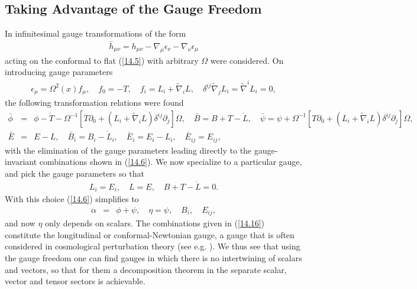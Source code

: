 \documentclass[aps,onecolumn,10pt]{revtex4}
\numberwithin{equation}{section}
\numberwithin{equation}{section}
\begin{document}
\subsection{Taking Advantage of the Gauge Freedom}
\label{14c}

In \cite{Amarasinghe2018} infinitesimal gauge transformations of the form 
%
\begin{eqnarray}
\bar{h}_{\mu\nu}=h_{\mu\nu}-\nabla _{\mu}\epsilon_{\nu}-\nabla _{\nu}\epsilon_{\mu}
\label{14.12}
\end{eqnarray}
% 
acting on the conformal to flat (\ref{14.5}) with arbitrary $\Omega$ were considered. On introducing gauge parameters
%
\begin{eqnarray}
\epsilon_{\mu}=\Omega^2(x)f_{\mu},\quad f_{0}=-T,\quad f_i=L_i+\tilde{\nabla}_iL,\quad \delta^{ij}\tilde{\nabla}_jL_i=\tilde{\nabla}^iL_i=0,
\label{14.13}
\end{eqnarray}
%
the following transformation relations were found
%
\begin{eqnarray}
\bar{\phi}&=&\phi-\dot{T}-\Omega^{-1}[T\partial_0+(L_i+\tilde{\nabla}_iL)\delta^{ij}\partial_j]\Omega,\quad \bar{B}=B+T-\dot{L},\quad \bar{\psi}=\psi+\Omega^{-1}[T\partial_0+(L_i+\tilde{\nabla}_iL)\delta^{ij}\partial_j]\Omega,
\nonumber\\
\bar{E}&=&E-L,\quad \bar{B}_i=B_i-\dot{L}_i,\quad \bar{E}_i=E_i-L_i, \quad \bar{E}_{ij}=E_{ij},
\label{14.14}
\end{eqnarray}
%
with the elimination of the gauge parameters leading directly to the gauge-invariant combinations shown in (\ref{14.6}). We now specialize to a particular gauge, and pick the gauge parameters so that 
%
\begin{eqnarray}
L_i=E_i,\quad L=E, \quad B+T-\dot{L}=0.
\label{14.15}
\end{eqnarray}
%
With this choice (\ref{14.6}) simplifies to
%
\begin{eqnarray}
\alpha &=& \phi +\psi, \quad \eta=\psi ,\quad B_i,\quad E_{ij},
\label{14.16}
\end{eqnarray}
%
and now $\eta$ only depends on scalars. The combinations given in (\ref{14.16}) constitute the longitudinal or conformal-Newtonian gauge, a gauge that is often considered in cosmological perturbation theory (see e.g. \cite{Mukhanov1992, Bertschinger1996}). We thus see that using the gauge freedom one can find gauges in which there is no intertwining of scalars and vectors, so that for them a decomposition theorem in the separate scalar, vector and tensor sectors is achievable.
\end{document}
